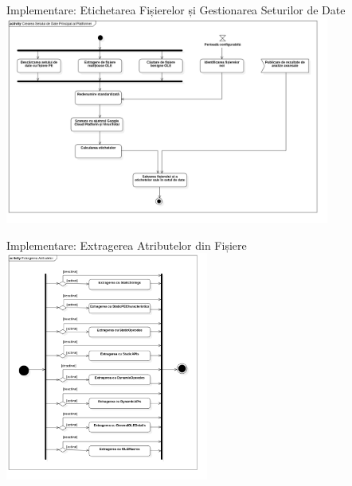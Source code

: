 \begin{frame}{Implementare: Etichetarea Fișierelor și Gestionarea Seturilor de Date}
	\includegraphics[width=0.8\textwidth, center]{components/images/diagrams/activity_diagram_dataset_creation.png}
    \captionsetup{justification=centering,margin=1cm}
\end{frame}

\begin{frame}{Implementare: Extragerea Atributelor din Fișiere}
	\includegraphics[width=0.5\textwidth, center]{components/images/diagrams/activity_diagram_attribute_extraction.png}
    \captionsetup{justification=centering,margin=1cm}
\end{frame}

